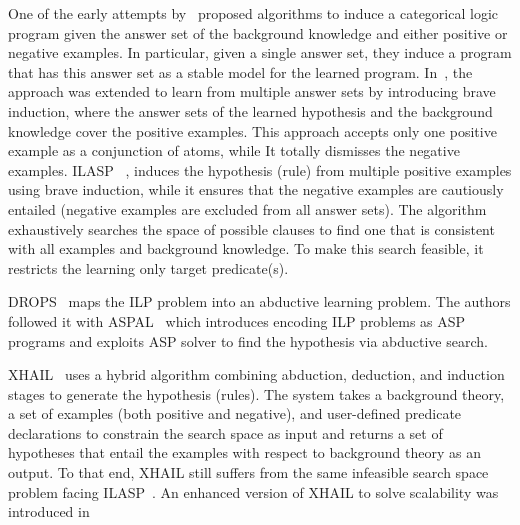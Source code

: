  One of the early attempts by~\cite{DBLP:journals/tocl/Sakama05} proposed algorithms to induce a categorical logic program given the answer set of the background knowledge and either positive or negative examples. In particular, given a single answer set, they induce a program that has this answer set as a stable model for the learned program. In~\cite{Sakama2009}, the approach was extended to learn from multiple answer sets by introducing brave induction, where the answer sets of the learned hypothesis and the background knowledge cover the positive examples. This approach accepts only one positive example as a conjunction of atoms, while It totally dismisses the negative examples. ILASP ~\cite{ILASP_system}, induces the hypothesis (\ie rule) from multiple positive examples using brave induction, while it ensures that the negative examples are cautiously entailed (\ie negative examples are excluded from all answer sets). The algorithm exhaustively searches the space of possible clauses to find one that is consistent with all examples and background knowledge. To make this search feasible, it restricts the learning only target predicate(s). 


 DROPS~\cite{CorapiRL10} maps the ILP problem into an abductive learning problem. The authors followed it with ASPAL~\cite{ASPAL} which introduces encoding ILP problems as ASP programs and exploits ASP solver to find the hypothesis via abductive search. 

XHAIL~\cite{XHAIL} uses a hybrid algorithm combining abduction, deduction, and induction stages to generate the hypothesis (\ie rules). The system takes a background theory, a set of examples (both positive and negative), and user-defined predicate declarations to constrain the search space as input and returns a set of hypotheses that entail the examples with respect to background theory as an output. To that end, XHAIL still suffers from the same infeasible search space problem facing ILASP~\cite{Sakama2009}. An enhanced version of XHAIL to solve scalability was introduced in~\cite{XHAIL_extended} 





